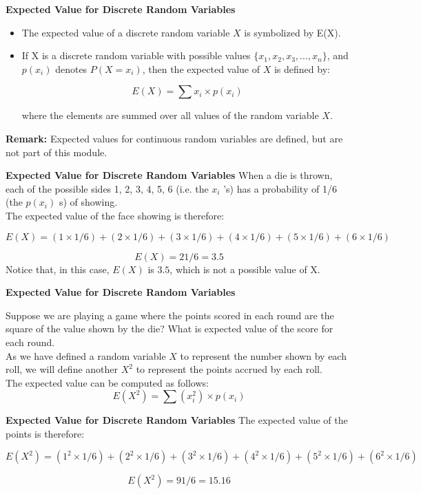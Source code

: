 \documentclass[00-IntroStatsMaster.tex]{subfiles}
\begin{document}
	{
		
		\textbf{Expected Value for Discrete Random Variables}
		
		\begin{itemize}
			\item The expected value of a discrete random variable $X$ is symbolized by E(X).
			
			\item If X is a discrete random variable with possible values $\{ x_1, x_2, x_3,\ldots , x_n\}$, and $p(x_i)$ denotes $P(X = x_i)$, then the expected value of $X$ is defined by:
			
			\[
			E(X) = \sum x_i \times p(x_i)
			\]
			
			where the elements are summed over all values of the random variable $X$.
			
		\end{itemize}
		
		\textbf{Remark: } Expected values for continuous random variables are defined, but are not part of this module.
	}
	{
		\textbf{Expected Value for Discrete Random Variables}
		When a die is thrown, each of the possible sides 1, 2, 3, 4, 5, 6 (i.e. the $x_i$ 's) has a
		probability of 1/6 (the $p(x_i)$ s) of showing.
		\\ \bigskip
		The expected value of the face showing is therefore:
		
		\[E(X) = (1 \times 1/6) + (2 \times 1/6) + (3 \times 1/6) + (4 \times 1/6) + (5 \times 1/6) + (6 \times 1/6)\]
		
		\[E(X) = 21/6 = 3.5 \]
		\bigskip
		Notice that, in this case, $E(X)$ is $3.5$, which is not a possible value of X.
		
		
	}
	{
		\textbf{Expected Value for Discrete Random Variables}
		
		Suppose we are playing a game where the points scored in each round are the square of the value shown by the die?
		What is expected value of the score for each round.
		\\ \bigskip
		As we have defined a random variable $X$ to represent the number shown by each roll, we will define another $X^2$ to represent the points accrued by each roll.
		\\ \bigskip
		The expected value can be computed as follows:
		\[
		E(X^2) = \sum (x_i^2) \times p(x_i)
		\]
	}
	{
		\textbf{Expected Value for Discrete Random Variables}
		The expected value of the points is therefore:
		
		\[E(X^2) = (1^2 \times 1/6) + (2^2 \times 1/6) + (3^2 \times 1/6) + (4^2 \times 1/6) + (5^2 \times 1/6) + (6^2 \times 1/6)\]
		
		\[E(X^2) = 91/6 = 15.16 \]
		
		
	}
	
\end{document}
